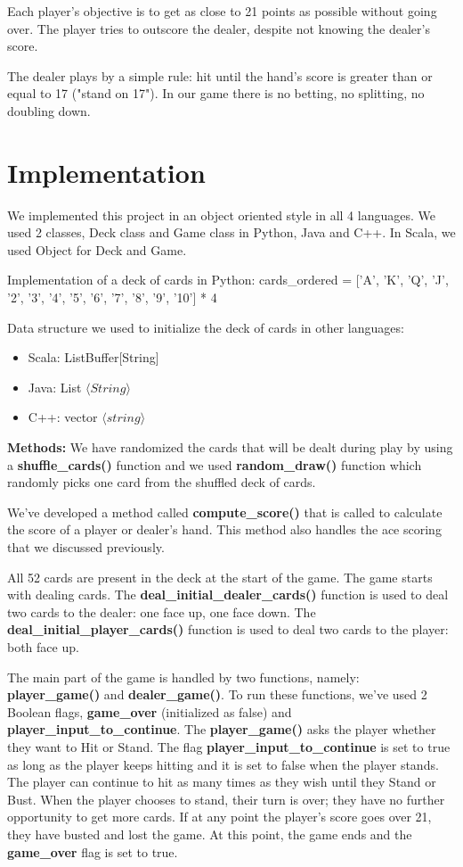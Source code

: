 \documentclass[12pt]{article}
\begin{document}
Each player's objective is to get as close to 21 points as possible without going over.
The player tries to outscore the dealer, despite not knowing the dealer's score.

The dealer plays by a simple rule: hit until the hand's score is greater than or equal to 17 ("stand on 17"). In our game there is no betting, no splitting, no doubling down.

\section{Implementation}

We implemented this project in an object oriented style in all 4 languages. We used 2 classes, Deck class and Game class in Python, Java and C++. In Scala, we used Object for Deck and Game.

Implementation of a deck of cards in Python: 
cards\_ordered = ['A', 'K', 'Q', 'J', '2', '3', '4', '5', '6', '7', '8', '9', '10'] * 4

Data structure we used to initialize the deck of cards in other languages:
\begin{itemize}
    \item Scala: ListBuffer[String]
    \item Java: List $\langle String \rangle$
    
    \item C++: vector $\langle string \rangle$
\end{itemize}

\textbf{Methods:} We have randomized the cards that will be dealt during play by using a \textbf{shuffle\_cards()} function and we used \textbf{random\_draw()} function which randomly picks one card from the shuffled deck of cards.

We've developed a method called \textbf{compute\_score()} that is called to calculate the score of a player or dealer's hand. This method also handles the ace scoring that we discussed previously.

All 52 cards are present in the deck at the start of the game. The game starts with dealing cards. The \textbf{deal\_initial\_dealer\_cards()} function is used to deal two cards to the dealer: one face up, one face down. The \textbf{deal\_initial\_player\_cards()}  function is used to deal two cards to the player: both face up.

The main part of the game is handled by two functions, namely: \textbf{player\_game()} and \textbf{dealer\_game()}. To run these functions, we've used 2 Boolean flags, \textbf{game\_over} (initialized as false) and \textbf{player\_input\_to\_continue}. The \textbf{player\_game()} asks the player whether they want to Hit or Stand. The flag \textbf{player\_input\_to\_continue} is set to true as long as the player keeps hitting and it is set to false when the player stands. The player can continue to hit as many times as they wish until they Stand or Bust. When the player chooses to stand, their turn is over; they have no further opportunity to get more cards. If at any point the player's score goes over 21, they have busted and lost the game. At this point, the game ends and the \textbf{game\_over} flag is set to true.
\end{document}
